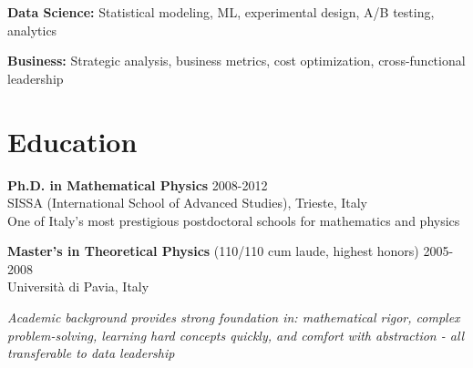 \documentclass[10pt,a4paper]{article}
\begin{document}
\textbf{Data Science:} Statistical modeling, ML, experimental design, A/B testing, analytics

\textbf{Business:} Strategic analysis, business metrics, cost optimization, cross-functional leadership

\section*{Education}

\noindent
\textbf{Ph.D. in Mathematical Physics} \hfill {\small\color{darkgray} 2008-2012} \\
SISSA (International School of Advanced Studies), Trieste, Italy \\
{\small One of Italy's most prestigious postdoctoral schools for mathematics and physics}

\noindent
\textbf{Master's in Theoretical Physics} (110/110 cum laude, highest honors) \hfill {\small\color{darkgray} 2005-2008} \\
Università di Pavia, Italy

\vspace{8pt}
\noindent
\textit{Academic background provides strong foundation in: mathematical rigor, complex problem-solving, learning hard concepts quickly, and comfort with abstraction - all transferable to data leadership}
\end{document}
